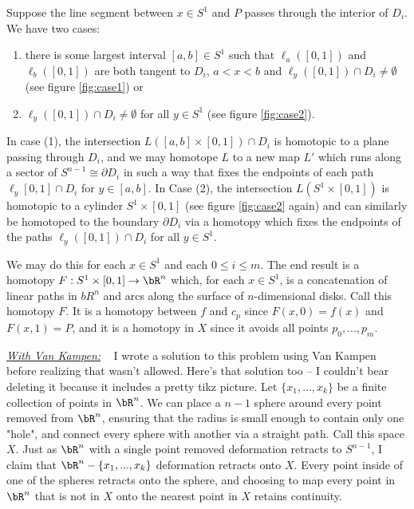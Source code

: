 \begin{homework}[e]
\begin{prf}
  Suppose the line segment between $x \in S^1$ and $P$ passes through the interior of $D_i$. We have two cases: 
  \begin{enumerate}
    \item there is some largest interval $[a,b] \in S^1$ such that $\ell_a([0,1])$ and $\ell_b([0,1])$ are both tangent to $D_i$, $a < x < b$ and $\ell_y([0,1]) \cap D_i \neq \emptyset$ (see figure \ref{fig:case1}) or
    \item $\ell_y([0,1]) \cap D_i \neq \emptyset$ for all $y \in S^1$ (see figure \ref{fig:case2}).
  \end{enumerate}
  In case (1), the intersection $L([a,b] \times [0,1]) \cap D_i$ is homotopic to a plane passing through $D_i$, and we may homotope $L$ to a new map $L'$ which runs along a sector of $S^{n-1} \cong \partial D_i$ in such a way that fixes the endpoints of each path $\ell_y[0,1]\cap D_i$ for $y\in [a,b]$. In Case (2), the intersection $L(S^1 \times [0,1])$ is homotopic to a cylinder $S^1 \times [0,1]$ (see figure \ref{fig:case2} again) and can similarly be homotoped to the boundary $\partial D_i$ via a homotopy which fixes the endpoints of the paths $\ell_y([0,1])\cap D_i$ for all $y \in S^1$. 

  We may do this for each $x \in S^1$ and each $0\leq i\leq m$. The end result is a homotopy $F:S^1\times [0,1] \to \bR^n$ which, for each $x \in S^1$, is a concatenation of linear paths in $bR^n$ and arcs along the surface of $n$-dimensional disks. Call this homotopy $F$. It is a homotopy between $f$ and $c_p$ since $F(x,0) = f(x)$ and $F(x,1) = P$, and it is a homotopy in $X$ since it avoids all points $p_0,...,p_m$.

  \bigskip

  \underline{\emph{With Van Kampen:}} ~ I wrote a solution to this problem using Van Kampen before realizing that wasn't allowed. Here's that solution too -- I couldn't bear deleting it because it includes a pretty tikz picture.
Let $\{x_1,...,x_k\}$ be a finite collection of points in $\bR^n$. We can place a ${n-1}$ sphere around every point removed from $\bR^n$, ensuring that the radius is small enough to contain only one "hole", and connect every sphere with another via a straight path. Call this space $X$. Just as $\bR^n$ with a single point removed deformation retracts to $S^{n-1}$, I claim that $\bR^n - \{x_1,...,x_k\}$ deformation retracts onto $X$. Every point inside of one of the spheres retracts onto the sphere, and choosing to map every point in $\bR^n$ that is not in $X$ onto the nearest point in $X$ retains continuity. 


\end{prf}
\end{homework}
